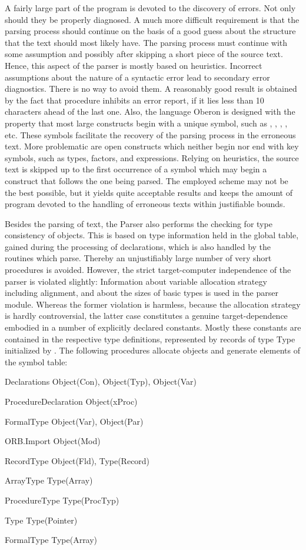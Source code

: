 A fairly large part of the program is devoted to the discovery of errors. Not only should they be properly diagnosed. A much more difficult requirement is that the parsing process should continue on the basis of a good guess about the structure that the text should most likely have. The parsing process must continue with some assumption and possibly after skipping a short piece of the source text. Hence, this aspect of the parser is mostly based on heuristics. Incorrect assumptions about the nature of a syntactic error lead to secondary error diagnostics. There is no way to avoid them. A reasonably good result is obtained by the fact that procedure  inhibits an error report, if it lies less than 10 characters ahead of the last one. Also, the language Oberon is designed with the property that most large constructs begin with a unique symbol, such as , , , , etc. These symbols facilitate the recovery of the parsing process in the erroneous text. More problematic are open constructs which neither begin nor end with key symbols, such as types, factors, and expressions. Relying on heuristics, the source text is skipped up to the first occurrence of a symbol which may begin a construct that follows the one being parsed. The employed scheme may not be the best possible, but it yields quite acceptable results and keeps the amount of program devoted to the handling of erroneous texts within justifiable bounds.

Besides the parsing of text, the Parser also performs the checking for type consistency of objects. This is based on type information held in the global table, gained during the processing of declarations, which is also handled by the routines which parse. Thereby an unjustifiably large number of very short procedures is avoided. However, the strict target-computer independence of the parser is violated slightly: Information about variable allocation strategy including alignment, and about the sizes of basic types is used in the parser module. Whereas the former violation is harmless, because the allocation strategy is hardly controversial, the latter case constitutes a genuine target-dependence embodied in a number of explicitly declared constants. Mostly these constants are contained in the respective type definitions, represented by records of type Type initialized by . The following procedures allocate objects and generate elements of the symbol table:
\medskip
\item{Declarations} Object(Con), Object(Typ), Object(Var) 
\item{ProcedureDeclaration} Object(xProc)
\item{FormalType} Object(Var), Object(Par)
\item{ORB.Import} Object(Mod)
\item{RecordType} Object(Fld), Type(Record) 
\item{ArrayType} Type(Array) 
\item{ProcedureType} Type(ProcTyp) 
\item{Type} Type(Pointer) 
\item{FormalType} Type(Array)
\medskip

